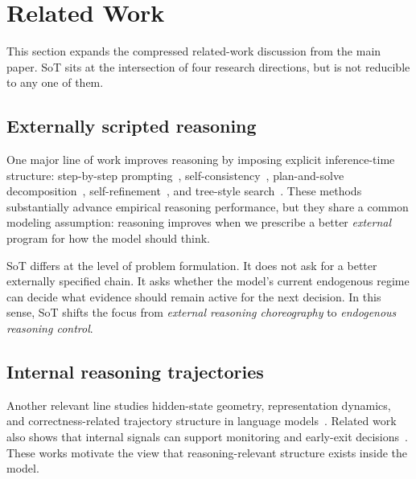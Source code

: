 \section{Related Work}
\label{app:related_work}
\vspace{-1mm}

This section expands the compressed related-work discussion from the main paper.
SoT sits at the intersection of four research directions, but is not reducible to any one of them.
\vspace{-1mm}

\subsection{Externally scripted reasoning}
\vspace{-1mm}
One major line of work improves reasoning by imposing explicit inference-time structure:
step-by-step prompting~\citep{wei2022chain},
self-consistency~\citep{wang2023selfconsistency},
plan-and-solve decomposition~\citep{wang2023plan},
self-refinement~\citep{madaan2023self},
and tree-style search~\citep{yao2023tree}.
These methods substantially advance empirical reasoning performance, but they share a common modeling assumption:
reasoning improves when we prescribe a better \emph{external} program for how the model should think.

SoT differs at the level of problem formulation.
It does not ask for a better externally specified chain.
It asks whether the model's current endogenous regime can decide what evidence should remain active for the next decision.
In this sense, SoT shifts the focus from \emph{external reasoning choreography} to \emph{endogenous reasoning control}.

\vspace{-1mm}
\subsection{Internal reasoning trajectories}
\vspace{-1mm}
Another relevant line studies hidden-state geometry, representation dynamics, and correctness-related trajectory structure in language models~\citep{ballon2026probing,damirchi2026truth,park2025geometry,park2024linear,sun2026llm}.
Related work also shows that internal signals can support monitoring and early-exit decisions~\citep{feng2025monitoring,hosseini2026early,tikhonov2026confidence}.
These works motivate the view that reasoning-relevant structure exists inside the model.

